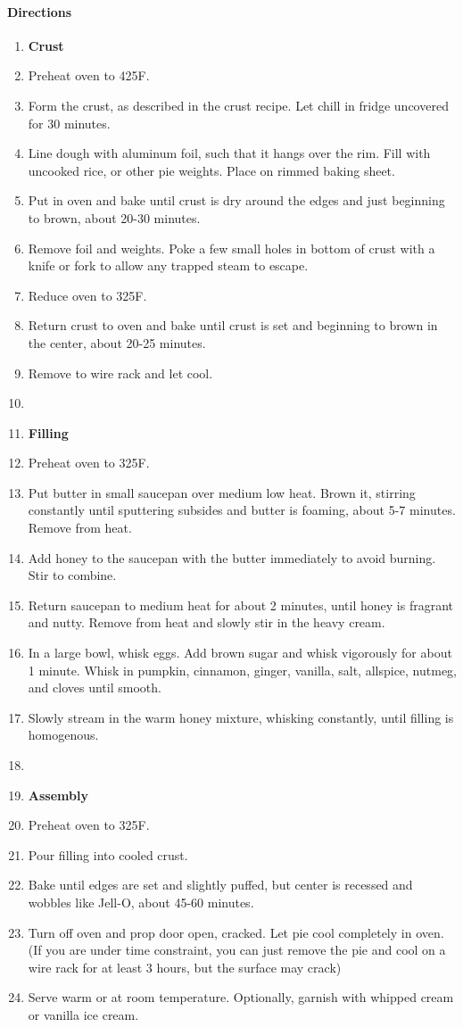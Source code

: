 \documentclass[12pt]{article}
\newenvironment*{directions}
	{
		\paragraph*{Directions}
		\begin{enumerate}
	}
	{
		\end{enumerate}
	}
\begin{document}
	\begin{directions}
		\item[] \textbf{Crust}
		\item Preheat oven to 425F.
		\item Form the crust, as described in the crust recipe. Let chill in fridge uncovered for 30 minutes.
		\item Line dough with aluminum foil, such that it hangs over the rim. Fill with uncooked rice, or other pie weights. Place on rimmed baking sheet.
		\item Put in oven and bake until crust is dry around the edges and just beginning to brown, about 20-30 minutes.
		\item Remove foil and weights. Poke a few small holes in bottom of crust with a knife or fork to allow any trapped steam to escape.
		\item Reduce oven to 325F.
		\item Return crust to oven and bake until crust is set and beginning to brown in the center, about 20-25 minutes.
		\item Remove to wire rack and let cool.
		\item[] \hfill
		\item[] \textbf{Filling}
		\item Preheat oven to 325F.
		\item Put butter in small saucepan over medium low heat. Brown it, stirring constantly until sputtering subsides and butter is foaming, about 5-7 minutes. Remove from heat.
		\item Add honey to the saucepan with the butter immediately to avoid burning. Stir to combine.
		\item Return saucepan to medium heat for about 2 minutes, until honey is fragrant and nutty. Remove from heat and slowly stir in the heavy cream.
		\item In a large bowl, whisk eggs. Add brown sugar and whisk vigorously for about 1 minute. Whisk in pumpkin, cinnamon, ginger, vanilla, salt, allspice, nutmeg, and cloves until smooth.
		\item Slowly stream in the warm honey mixture, whisking constantly, until filling is homogenous.
		\item[] \hfill
		\item[] \textbf{Assembly}
		\item Preheat oven to 325F.
		\item Pour filling into cooled crust.
		\item Bake until edges are set and slightly puffed, but center is recessed and wobbles like Jell-O, about 45-60 minutes.
		\item Turn off oven and prop door open, cracked. Let pie cool completely in oven. (If you are under time constraint, you can just remove the pie and cool on a wire rack for at least 3 hours, but the surface may crack)
		\item Serve warm or at room temperature. Optionally, garnish with whipped cream or vanilla ice cream.
	\end{directions}
	
\end{document}
